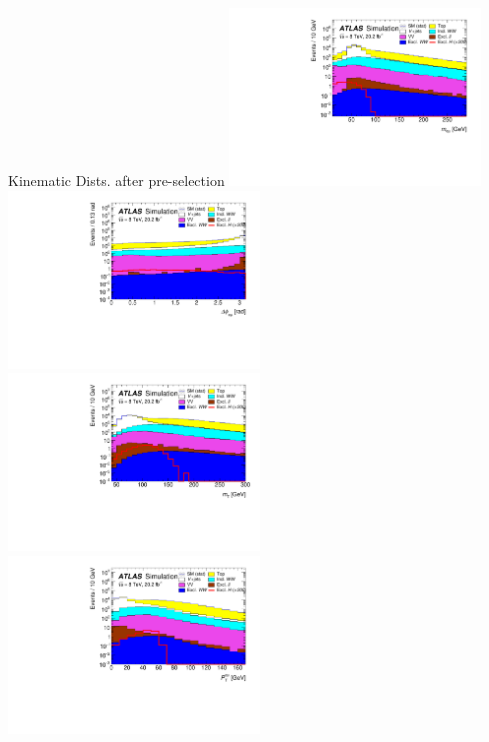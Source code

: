 \documentclass[10pt]{beamer}
\begin{document}
\begin{frame}{Kinematic Dists. after pre-selection}
   \includegraphics[width=0.5\textwidth]{figures/emme-CutMll-Mll-log.pdf}
   \includegraphics[width=0.5\textwidth]{figures/emme-CutMll-DPhill-log.pdf}\\
   \includegraphics[width=0.5\textwidth]{figures/emme-CutMll-MT-log.pdf}
   \includegraphics[width=0.5\textwidth]{figures/emme-CutMll-Ptll-log.pdf}
\end{frame}
\end{document}
